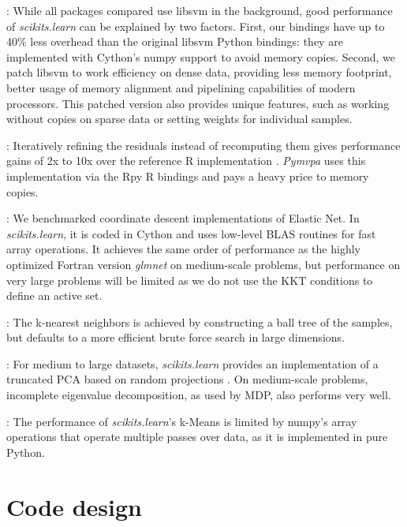 \documentclass[twoside,11pt]{article}
\begin{document}
\smallskip {}:
%
While all packages compared use libsvm in the background, good
performance of \emph{scikits.learn} can be explained by two factors.
First, our bindings have up to 40\% less overhead than the original
libsvm Python bindings: they are implemented with Cython's numpy support
to avoid memory copies. Second, we patch libsvm to work efficiency
on dense data, providing less memory footprint, better usage of memory
alignment and pipelining capabilities of modern processors. This patched
version also provides unique features, such as working without copies on
sparse data or setting weights for individual samples.


\smallskip {}:
%
Iteratively refining the residuals instead of recomputing them gives
performance gains of 2x to 10x over the reference R implementation
\citep{LARS}. {\sl Pymvpa} uses this implementation via the Rpy R
bindings and pays a heavy price to memory copies.


\smallskip {}:
%
We benchmarked coordinate descent implementations of Elastic Net.  In
\emph{scikits.learn}, it is coded in Cython and uses low-level BLAS
routines for fast array operations. It achieves the same order of
performance as the highly optimized Fortran version \emph{glmnet}
\citep{friedman2010} on medium-scale problems, but performance on very
large problems will be limited as we do not use the KKT conditions to
define an active set.

\smallskip
{}:
%
The k-nearest neighbors is achieved by constructing a ball
tree \citep{omohundro1989} of the samples, but defaults to a more
efficient brute force search in large dimensions.

\smallskip {}:
%
For medium to large datasets, \emph{scikits.learn} provides an
implementation of a truncated PCA based on random projections
\citep{rokhlin2009}. On medium-scale problems, incomplete eigenvalue
decomposition, as used by MDP, also performs very well.

\smallskip 
{}:
%
The performance of \emph{scikits.learn}'s k-Means is limited by numpy's
array operations that operate multiple passes over data, as it is
implemented in pure Python.

\section{Code design}
\end{document}
